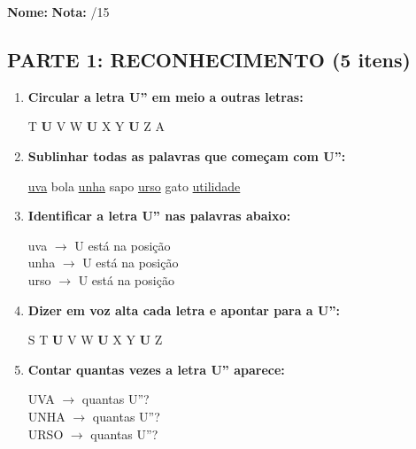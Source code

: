 \begin{exercicio}

\noindent\textbf{Nome:} \underline{\hspace{4cm}} \quad \textbf{Nota:} \underline{\hspace{1cm}}/15

\subsection*{PARTE 1: RECONHECIMENTO (5 itens)}

\begin{enumerate}
  \item \textbf{Circular a letra U'' em meio a outras letras:}
  \begin{center}
  T \quad \textbf{U} \quad V \quad W \quad \textbf{U} \quad X \quad Y \quad \textbf{U} \quad Z \quad A
  \end{center}

  \item \textbf{Sublinhar todas as palavras que começam com U'':}
  \begin{center}
  \uline{uva} \quad bola \quad \uline{unha} \quad sapo \quad \uline{urso} \quad gato \quad \uline{utilidade}
  \end{center}

  \item \textbf{Identificar a letra U'' nas palavras abaixo:}
  \begin{center}
  uva $\rightarrow$ U está na posição \underline{\hspace{1cm}} \\
  unha $\rightarrow$ U está na posição \underline{\hspace{1cm}} \\
  urso $\rightarrow$ U está na posição \underline{\hspace{1cm}}
  \end{center}

  \item \textbf{Dizer em voz alta cada letra e apontar para a U'':}
  \begin{center}
  S \quad T \quad \textbf{U} \quad V \quad W \quad \textbf{U} \quad X \quad Y \quad \textbf{U} \quad Z
  \end{center}

  \item \textbf{Contar quantas vezes a letra U'' aparece:}
  \begin{center}
  UVA $\rightarrow$ quantas U''? \underline{\hspace{1cm}} \\
  UNHA $\rightarrow$ quantas U''? \underline{\hspace{1cm}} \\
  URSO $\rightarrow$ quantas U''? \underline{\hspace{1cm}}
  \end{center}
\end{enumerate}


\end{exercicio}
